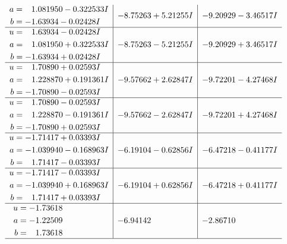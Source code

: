 \documentclass[1p]{elsarticle_modified}
\theoremstyle{definition}
\begin{document}
$$\begin{array}{c|c|c}
\begin{aligned}
a &= \phantom{-}1.081950 - 0.322533 I \\
b &= -1.63934 - 0.02428 I\end{aligned}
 & -8.75263 + 5.21255 I & -9.20929 - 3.46517 I \\ \hline\begin{aligned}
u &= \phantom{-}1.63934 - 0.02428 I \\
a &= \phantom{-}1.081950 + 0.322533 I \\
b &= -1.63934 + 0.02428 I\end{aligned}
 & -8.75263 - 5.21255 I & -9.20929 + 3.46517 I \\ \hline\begin{aligned}
u &= \phantom{-}1.70890 + 0.02593 I \\
a &= \phantom{-}1.228870 + 0.191361 I \\
b &= -1.70890 - 0.02593 I\end{aligned}
 & -9.57662 + 2.62847 I & -9.72201 - 4.27468 I \\ \hline\begin{aligned}
u &= \phantom{-}1.70890 - 0.02593 I \\
a &= \phantom{-}1.228870 - 0.191361 I \\
b &= -1.70890 + 0.02593 I\end{aligned}
 & -9.57662 - 2.62847 I & -9.72201 + 4.27468 I \\ \hline\begin{aligned}
u &= -1.71417 + 0.03393 I \\
a &= -1.039940 - 0.168963 I \\
b &= \phantom{-}1.71417 - 0.03393 I\end{aligned}
 & -6.19104 - 0.62856 I & -6.47218 - 0.41177 I \\ \hline\begin{aligned}
u &= -1.71417 - 0.03393 I \\
a &= -1.039940 + 0.168963 I \\
b &= \phantom{-}1.71417 + 0.03393 I\end{aligned}
 & -6.19104 + 0.62856 I & -6.47218 + 0.41177 I \\ \hline\begin{aligned}
u &= -1.73618\phantom{ +0.000000I} \\
a &= -1.22509\phantom{ +0.000000I} \\
b &= \phantom{-}1.73618\phantom{ +0.000000I}\end{aligned}
 & -6.94142\phantom{ +0.000000I} & -2.86710\phantom{ +0.000000I}\\
 \hline 
 \end{array}$$\newpage\newpage\renewcommand{\arraystretch}{1}
\end{document}
